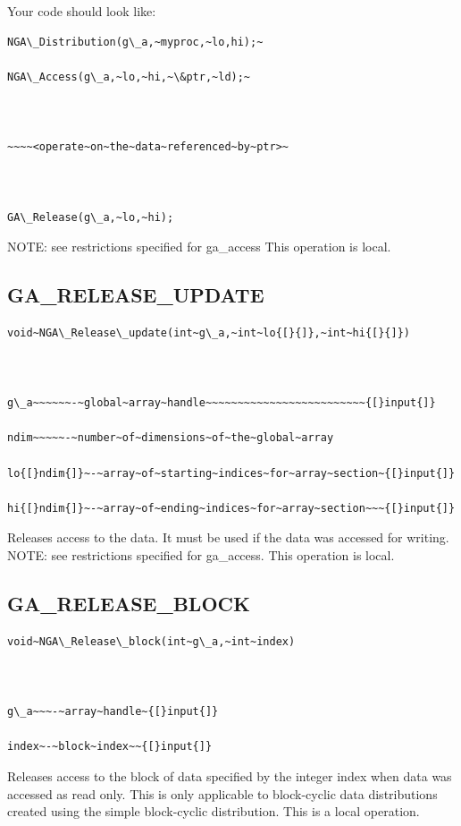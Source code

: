 Your code should look like:
\begin{verbatim}
NGA\_Distribution(g\_a,~myproc,~lo,hi);~

NGA\_Access(g\_a,~lo,~hi,~\&ptr,~ld);~



~~~~<operate~on~the~data~referenced~by~ptr>~



GA\_Release(g\_a,~lo,~hi);
\end{verbatim}
NOTE: see restrictions specified for ga\_access This operation is
local. 


\subsection*{\label{sub:GA_RELEASE_UPDATE}GA\_RELEASE\_UPDATE}
\begin{verbatim}
void~NGA\_Release\_update(int~g\_a,~int~lo{[}{]},~int~hi{[}{]})



g\_a~~~~~~-~global~array~handle~~~~~~~~~~~~~~~~~~~~~~~~~{[}input{]}

ndim~~~~~-~number~of~dimensions~of~the~global~array

lo{[}ndim{]}~-~array~of~starting~indices~for~array~section~{[}input{]}

hi{[}ndim{]}~-~array~of~ending~indices~for~array~section~~~{[}input{]}
\end{verbatim}
Releases access to the data. It must be used if the data was accessed
for writing. NOTE: see restrictions specified for ga\_access. This
operation is local.


\subsection*{\label{sub:GA_RELEASE_BLOCK}GA\_RELEASE\_BLOCK}
\begin{verbatim}
void~NGA\_Release\_block(int~g\_a,~int~index)



g\_a~~~-~array~handle~{[}input{]}

index~-~block~index~~{[}input{]}
\end{verbatim}
Releases access to the block of data specified by the integer index
when data was accessed as read only. This is only applicable to block-cyclic
data distributions created using the simple block-cyclic distribution.
This is a local operation. 


